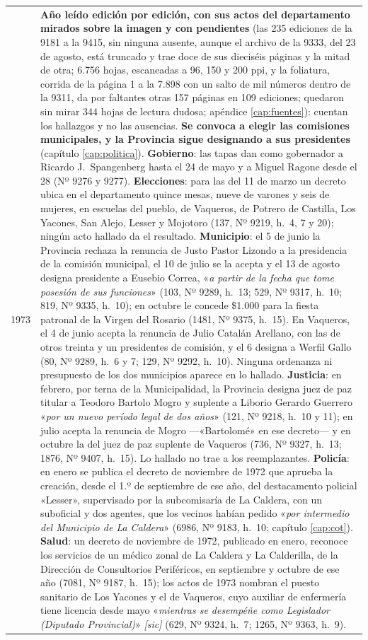 \begin{longtable}{@{}p{2.7cm}p{10.3cm}@{}}
1973 & \textbf{Año leído edición por edición, con sus actos del departamento mirados sobre la imagen y con pendientes} (las 235 ediciones de la 9181 a la 9415, sin ninguna ausente, aunque el archivo de la 9333, del 23 de agosto, está truncado y trae doce de sus dieciséis páginas y la mitad de otra; 6.756 hojas, escaneadas a 96, 150 y 200 ppi, y la foliatura, corrida de la página 1 a la 7.898 con un salto de mil números dentro de la 9311, da por faltantes otras 157 páginas en 109 ediciones; quedaron sin mirar 344 hojas de lectura dudosa; apéndice \ref{cap:fuentes}): cuentan los hallazgos y no las ausencias. \textbf{Se convoca a elegir las comisiones municipales, y la Provincia sigue designando a sus presidentes} (capítulo \ref{cap:politica}). \textbf{Gobierno}: las tapas dan como gobernador a Ricardo J.\ Spangenberg hasta el 24 de mayo y a Miguel Ragone desde el 28 (Nº 9276 y 9277). \textbf{Elecciones}: para las del 11 de marzo un decreto ubica en el departamento quince mesas, nueve de varones y seis de mujeres, en escuelas del pueblo, de Vaqueros, de Potrero de Castilla, Los Yacones, San Alejo, Lesser y Mojotoro (137, Nº 9219, h.\ 4, 7 y 20); ningún acto hallado da el resultado. \textbf{Municipio}: el 5 de junio la Provincia rechaza la renuncia de Justo Pastor Lizondo a la presidencia de la comisión municipal, el 10 de julio se la acepta y el 13 de agosto designa presidente a Eusebio Correa, «\textit{a partir de la fecha que tome posesión de sus funciones}» (103, Nº 9289, h.\ 13; 529, Nº 9317, h.\ 10; 819, Nº 9335, h.\ 10); en octubre le concede \$1.000 para la fiesta patronal de la Virgen del Rosario (1481, Nº 9375, h.\ 15). En Vaqueros, el 4 de junio acepta la renuncia de Julio Catalán Arellano, con las de otros treinta y un presidentes de comisión, y el 6 designa a Werfil Gallo (80, Nº 9289, h.\ 6 y 7; 129, Nº 9292, h.\ 10). Ninguna ordenanza ni presupuesto de los dos municipios aparece en lo hallado. \textbf{Justicia}: en febrero, por terna de la Municipalidad, la Provincia designa juez de paz titular a Teodoro Bartolo Mogro y suplente a Liborio Gerardo Guerrero «\textit{por un nuevo período legal de dos años}» (121, Nº 9218, h.\ 10 y 11); en julio acepta la renuncia de Mogro ---«Bartolomé» en ese decreto--- y en octubre la del juez de paz suplente de Vaqueros (736, Nº 9327, h.\ 13; 1876, Nº 9407, h.\ 15). Lo hallado no trae a los reemplazantes. \textbf{Policía}: en enero se publica el decreto de noviembre de 1972 que aprueba la creación, desde el 1.º de septiembre de ese año, del destacamento policial «Lesser», supervisado por la subcomisaría de La Caldera, con un suboficial y dos agentes, que los vecinos habían pedido «\textit{por intermedio del Municipio de La Caldera}» (6986, Nº 9183, h.\ 10; capítulo \ref{cap:cot}). \textbf{Salud}: un decreto de noviembre de 1972, publicado en enero, reconoce los servicios de un médico zonal de La Caldera y La Calderilla, de la Dirección de Consultorios Periféricos, en septiembre y octubre de ese año (7081, Nº 9187, h.\ 15); los actos de 1973 nombran el puesto sanitario de Los Yacones y el de Vaqueros, cuyo auxiliar de enfermería tiene licencia desde mayo «\textit{mientras se desempéñe como Legislador (Diputado Provincial)}» \textit{[sic]} (629, Nº 9324, h.\ 7; 1265, Nº 9363, h.\ 9). 
\end{longtable}

